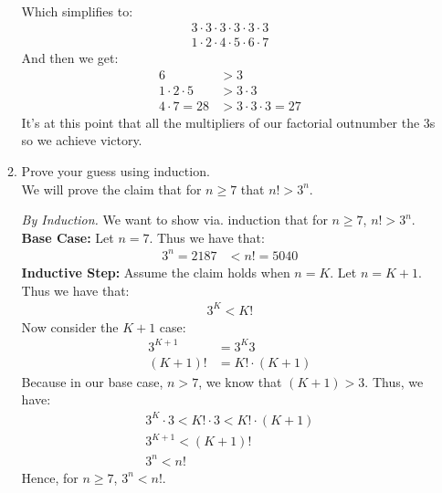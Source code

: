 \documentclass[10pt,oneside]{book}
\newcommand{\gspc}{\vspace{0.13cm}} %
\newcommand{\gline}{\gspc\\} %
\let\endoldproof\endproof
\renewenvironment{proof}[1][\proofname]
  {\vspace{0.2cm}\begin{adjustwidth}{2em}{2em}
   \oldproof[#1]}
  {\endoldproof
   \end{adjustwidth}}
\begin{document}
\begin{enumerate}
\begin{enumerate}
\begin{gather*}
    \end{gather*}
    Which simplifies to:
    \begin{gather*}
      3 \cdot 3 \cdot 3 \cdot 3 \cdot 3 \cdot 3\\
      1 \cdot 2 \cdot 4 \cdot 5 \cdot 6 \cdot 7
    \end{gather*}
    And then we get:
    \begin{align*}
      6 &> 3\\
      1\cdot 2 \cdot 5 &> 3\cdot 3\\
      4\cdot 7 =28&> 3 \cdot 3 \cdot 3 =27
    \end{align*}
    It's at this point that all the multipliers of our factorial outnumber the 3s so we achieve victory. 
    \item Prove your guess using induction.\gline
    We will prove the claim that for $n\ge 7$ that $n! > 3^n$.
    \begin{proof}
      \textit{By Induction. }We want to show via. induction that for $n\ge 7$, $n! > 3^n$.\gline
      \textbf{Base Case: }Let $n= 7$. Thus we have that:
      \begin{align*}
        3^n = 2187 &< n! = 5040
      \end{align*}
      \textbf{Inductive Step: }Assume the claim holds when $n = K$. Let $n = K+1$. Thus we have that:
      \begin{align*}
        3^K < K!
      \end{align*}
      Now consider the $K+1$ case:
      \begin{align*}
        3^{K+1}&=3^K3\\
        (K+1)! &= K! \cdot (K+1)
      \end{align*}
      Because in our base case, $n> 7$, we know that $(K+1) > 3$. Thus, we have:
      \begin{gather*}
        3^K\cdot 3 < K!\cdot 3 < K!\cdot(K+1)\\
        3^{K+1} < (K+1)!\\
        3^n < n!
      \end{gather*}
      Hence, for $n\ge 7$, $3^n < n!$.
    \end{proof}
  \end{enumerate}
  

\end{enumerate}
\end{document}

